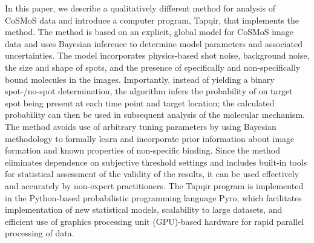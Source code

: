 In this paper, we describe a qualitatively different method for analysis of CoSMoS data and introduce a computer program, Tapqir, that implements the method. The method is based on an explicit, global model for CoSMoS image data and uses Bayesian inference to determine model parameters and associated uncertainties. The model incorporates physics-based shot noise, background noise, the size and shape of spots, and the presence of specifically and non-specifically bound molecules in the images. Importantly, instead of yielding a binary spot-/no-spot determination, the algorithm infers the probability of on target spot being present at each time point and target location; the calculated probability can then be used in subsequent analysis of the molecular mechanism. The method avoids use of arbitrary tuning parameters by using Bayesian methodology to formally learn and incorporate prior information about image formation and known properties of non-specific binding.  Since the method eliminates dependence on subjective threshold settings and includes built-in tools for statistical assessment of the validity of the results, it can be used effectively and accurately by non-expert practitioners. The Tapqir program is implemented in the Python-based probabilistic programming language Pyro, which facilitates implementation of new statistical models, scalability to large datasets, and efficient use of graphics processing unit (GPU)-based hardware for rapid parallel processing of data. 